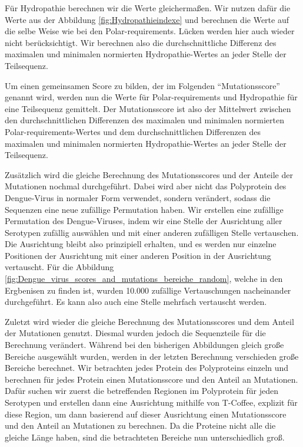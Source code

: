 \documentclass[german,version-2022-01]{uzl-thesis}
\begin{document}
F\"ur Hydropathie berechnen wir die Werte gleicherma\ss{}en. Wir nutzen daf\"ur die Werte aus der Abbildung \ref{fig:Hydropathieindexe} und berechnen die Werte auf die selbe Weise wie bei den Polar-requirements. L\"ucken werden hier auch wieder nicht ber\"ucksichtigt. Wir berechnen also die durchschnittliche Differenz des maximalen und minimalen normierten Hydropathie-Wertes an jeder Stelle der Teilsequenz. 

Um einen gemeinsamen Score zu bilden, der im Folgenden "`Mutationsscore"' genannt wird, werden nun die Werte f\"ur Polar-requirements und Hydropathie f\"ur eine Teilsequenz gemittelt. Der Mutationsscore ist also der Mittelwert zwischen den durchschnittlichen Differenzen des maximalen und minimalen normierten Polar-requirements-Wertes und dem durchschnittlichen Differenzen des maximalen und minimalen normierten Hydropathie-Wertes an jeder Stelle der Teilsequenz. 

Zus\"atzlich wird die gleiche Berechnung des Mutationsscores und der Anteile der Mutationen nochmal durchgef\"uhrt. Dabei wird aber nicht das Polyprotein des Dengue-Virus in normaler Form verwendet, sondern ver\"andert, sodass die Sequenzen eine neue zuf\"allige Permutation haben. Wir erstellen eine zuf\"allige Permutation des Dengue-Viruses, indem wir eine Stelle der Ausrichtung aller Serotypen zuf\"allig ausw\"ahlen und mit einer anderen zuf\"alligen Stelle vertauschen. Die Ausrichtung bleibt also prinzipiell erhalten, und es werden nur einzelne Positionen der Ausrichtung mit einer anderen Position in der Ausrichtung vertauscht. F\"ur die Abbildung \ref{fig:Dengue_virus_scores_and_mutations_bereiche_random}, welche in den Ergbenisen zu finden ist, wurden 10.000 zuf\"allige Vertauschungen nacheinander durchgef\"uhrt. Es kann also auch eine Stelle mehrfach vertauscht werden. 

Zuletzt wird wieder die gleiche Berechnung des Mutationsscores und dem Anteil der Mutationen genutzt. Diesmal wurden jedoch die Sequenzteile f\"ur die Berechnung ver\"andert. W\"ahrend bei den bisherigen Abbildungen gleich gro\ss{}e Bereiche ausgew\"ahlt wurden, werden in der letzten Berechnung verschieden gro\ss{}e Bereiche berechnet. Wir betrachten jedes Protein des Polyproteins einzeln und berechnen f\"ur jedes Protein einen Mutationsscore und den Anteil an Mutationen. Daf\"ur suchen wir zuerst die betreffenden Regionen im Polyprotein f\"ur jeden Serotypen und erstellen dann eine Ausrichtung mithilfe von T-Coffee, explizit f\"ur diese Region, um dann basierend auf dieser Ausrichtung einen Mutationsscore und den Anteil an Mutationen zu berechnen. Da die Proteine nicht alle die gleiche L\"ange haben, sind die betrachteten Bereiche nun unterschiedlich gro\ss{}.  
\end{document}
